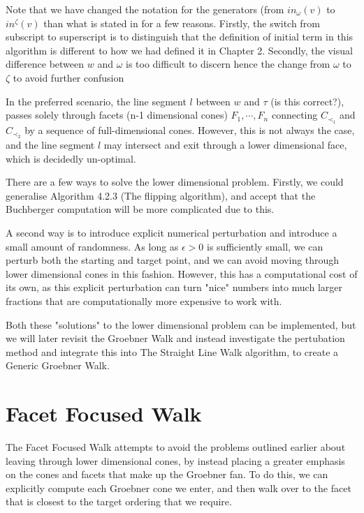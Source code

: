 \documentclass[12pt,a4paper]{report}
\begin{document}
Note that we have changed the notation for the generators (from $in_{\omega} (v)$ to $in^{\zeta} (v)$ than what is stated in \cite{GenericGroebner} for a few reasons. Firstly, the switch from subscript to superscript is to distinguish that the definition of initial term in this algorithm is different to how we had defined it in Chapter 2. Secondly, the visual difference between $w$ and $\omega$ is too difficult to discern hence the change from $\omega$ to $\zeta$ to avoid further confusion

In the preferred scenario, the line segment $l$ between $w$ and $\tau$ (is this correct?), passes solely through facets (n-1 dimensional cones) $F_{1}, \cdots, F_{n}$ connecting $C_{\prec_{1}}$ and $C_{\prec_{2}}$ by a sequence of full-dimensional cones. However, this is not always the case, and the line segment $l$ may intersect and exit through a lower dimensional face, which is decidedly un-optimal.

There are a few ways to solve the lower dimensional problem. Firstly, we could generalise Algorithm 4.2.3 (The flipping algorithm), and accept that the Buchberger computation will be more complicated due to this.

A second way is to introduce explicit numerical perturbation and introduce a small amount of randomness. As long as $\epsilon > 0$ is sufficiently small, we can perturb both the starting and target point, and we can avoid moving through lower dimensional cones in this fashion. However, this has a computational cost of its own, as this explicit perturbation can turn "nice" numbers into much larger fractions that are computationally more expensive to work with.

Both these "solutions" to the lower dimensional problem can be implemented, but we will later revisit the Groebner Walk and instead investigate the pertubation method and integrate this into The Straight Line Walk algorithm, to create a Generic Groebner Walk.

\section{Facet Focused Walk}
The Facet Focused Walk attempts to avoid the problems outlined earlier about leaving through lower dimensional cones, by instead placing a greater emphasis on the cones and facets that make up the Groebner fan. To do this, we can explicitly compute each Groebner cone we enter, and then walk over to the facet that is closest to the target ordering that we require.
\end{document}
